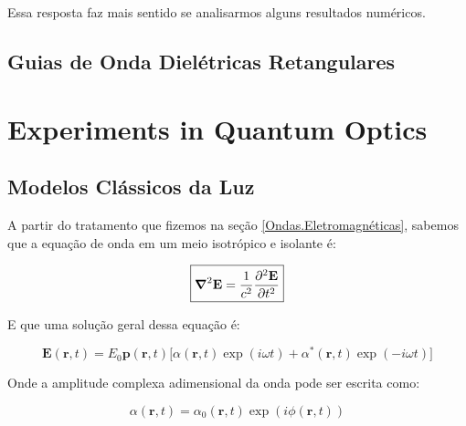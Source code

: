 \documentclass[12pt,a4paper]{report}
\begin{document}
Essa resposta faz mais sentido se analisarmos alguns resultados numéricos.

\pagebreak



\section{Guias de Onda Dielétricas Retangulares}

\pagebreak





\chapter{Experiments in Quantum Optics}

\section{Modelos Clássicos da Luz}

A partir do tratamento que fizemos na seção \ref{Ondas.Eletromagnéticas}, sabemos que a equação de onda em um meio isotrópico e isolante é:

\begin{equation}
   \boxed{\grad^2{\textbf{E}}=\frac{1}{c^2}\frac{\partial^2\textbf{E}}{\partial t^2}}
\end{equation}

E que uma solução geral dessa equação é:

\begin{equation}
    \textbf{E}(\textbf{r},t)=E_0\textbf{p}(\textbf{r},t)\bigl[\alpha(\textbf{r},t)\exp(i\omega t)+\alpha^*(\textbf{r},t)\exp(-i\omega t)\bigr]
\end{equation}

Onde a amplitude complexa adimensional da onda pode ser escrita como:

\begin{equation}
    \alpha(\textbf{r},t)=\alpha_0(\textbf{r},t)\exp(i\phi(\textbf{r},t))
\end{equation}
\end{document}
